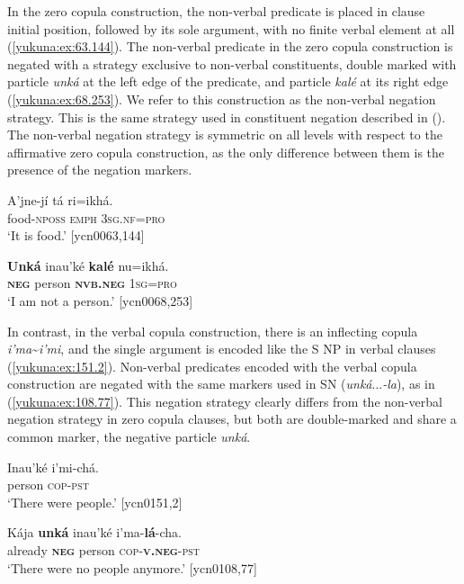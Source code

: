 \documentclass[output=paper,colorlinks,citecolor=brown]{langscibook}
\begin{document}
In the zero copula construction, the non-verbal predicate is placed in clause initial position, followed by its sole argument, with no finite verbal element at all (\ref{yukuna:ex:63.144}). The non-verbal predicate in the zero copula construction is negated with a strategy exclusive to non-verbal constituents, double marked with particle \textit{unká} at the left edge of the predicate, and particle \textit{kalé} at its right edge (\ref{yukuna:ex:68.253}). We refer to this construction as the non-verbal negation strategy. This is the same strategy used in constituent negation described in (). The non-verbal negation strategy is symmetric on all levels with respect to the affirmative zero copula construction, as the only difference between them is the presence of the negation markers. 

\ea\label{yukuna:ex:63.144}
\gll A'jne-jí tá ri=ikhá.\\
food-\textsc{nposs} \textsc{emph} \textsc{3sg.nf}=\textsc{pro} \\
\glt ‘It is food.’ [ycn0063,144]
\z

\ea\label{yukuna:ex:68.253}
\gll \textbf{Unká}	inau'ké \textbf{kalé} 	nu=ikhá. \\
\textbf{\textsc{neg}}	person	\textbf{\textsc{nvb.neg}} \textsc{1sg}=\textsc{pro} \\
\glt ‘I am not a person.’ [ycn0068,253]
\z

In contrast, in the verbal copula construction, there is an inflecting copula \textit{i'ma}{\textasciitilde}\textit{i'mi}, and the single argument is encoded like the S NP in verbal clauses (\ref{yukuna:ex:151.2}). Non-verbal predicates encoded with the verbal copula construction are negated with the same markers used in SN (\textit{unká}{...}\textit{-la}), as in (\ref{yukuna:ex:108.77}). This negation strategy clearly differs from the non-verbal negation strategy in zero copula clauses, but both are double-marked and share a common marker, the negative particle \textit{unká}.

\ea\label{yukuna:ex:151.2}
\gll Inau'ké i'mi-chá.\\
person \textsc{cop-pst}\\
\glt ‘There were people.’ [ycn0151,2]
\z

\ea\label{yukuna:ex:108.77}
\gll Kája \textbf{unká} inau'ké i'ma-\textbf{lá}-cha.\\
already \textbf{\textsc{neg}} person \textsc{cop}-\textbf{\textsc{v.neg}}-\textsc{pst} \\
\glt ‘There were no people anymore.’ [ycn0108,77]
\z
\end{document}
